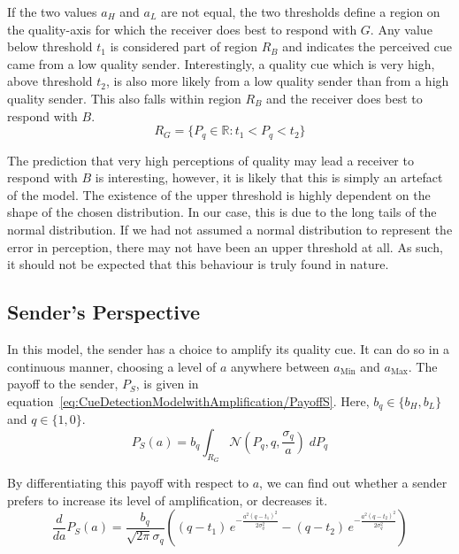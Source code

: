 \documentclass[a4paper,12pt]{article}
\numberwithin{equation}{section}
\begin{document}
If the two values $a_{H}$ and $a_{L}$ are not equal, the two thresholds define a region on the quality-axis for which the receiver does best to respond with $G$. Any value below threshold $t_{1}$ is considered part of region $R_{B}$ and indicates the perceived cue came from a low quality sender. Interestingly, a quality cue which is very high, above threshold $t_{2}$, is also more likely from a low quality sender than from a high quality sender. This also falls within region $R_{B}$ and the receiver does best to respond with $B$.
\begin{equation}
\label{eq:CueDetectionModelwithAmplification/RG}
R_{G} = \{P_{q} \in \mathbb{R} : t_{1}<P_{q}<t_{2}\}
\end{equation}

The prediction that very high perceptions of quality may lead a receiver to respond with $B$ is interesting, however, it is likely that this is simply an artefact of the model. The existence of the upper threshold is highly dependent on the shape of the chosen distribution. In our case, this is due to the long tails of the normal distribution. If we had not assumed a normal distribution to represent the error in perception, there may not have been an upper threshold at all. As such, it should not be expected that this behaviour is truly found in nature.


\subsection{Sender's Perspective}
\label{sec:CueDetectionModelwithAmplification/Sender's Perspective}

In this model, the sender has a choice to amplify its quality cue. It can do so in a continuous manner, choosing a level of $a$ anywhere between $a_{\text{Min}}$ and $a_{\text{Max}}$. The payoff to the sender, $P_{S}$, is given in equation~\ref{eq:CueDetectionModelwithAmplification/PayoffS}. Here, $b_{q} \in \{b_{H}, b_{L}\}$ and $q \in \{1, 0\}$.
\begin{equation}
\label{eq:CueDetectionModelwithAmplification/PayoffS}
P_{S}(a) = b_{q} \displaystyle \int_{R_{G}} \mathcal{N}(P_{q}, q, \frac{\sigma_{q}}{a}) \; dP_{q}
\end{equation}

By differentiating this payoff with respect to $a$, we can find out whether a sender prefers to increase its level of amplification, or decreases it.
\begin{equation}
\label{eq:CueDetectionModelwithAmplification/DifferentialPayoffS}
\frac{d}{da} P_{S}(a) = \frac{b_{q}}{\sqrt{2 \pi} \sigma_{q}} \left( (q-t_{1}) \, e^{-\frac{a^{2} (q-t_{1})^2}{2 \sigma_{q}^2}} - (q-t_{2}) \, e^{-\frac{a^{2} (q-t_{2})^2}{2 \sigma_{q}^2}} \right)
\end{equation}
\end{document}
